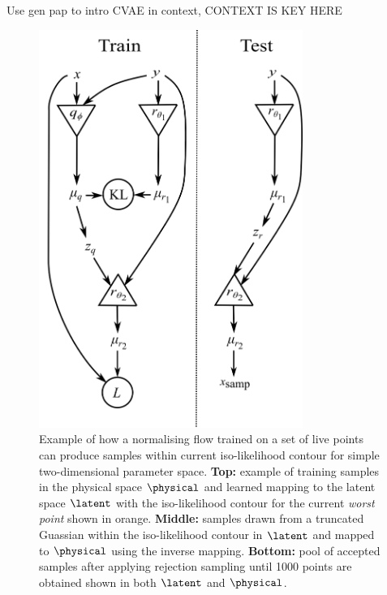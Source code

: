 \documentclass[aps,superscriptaddress,twocolumn,nopreprintnumbers,floatfix,groupedaddress]{revtex4-1}
\newcommand{\figwidth}{8.6cm}
\begin{document}
Use gen pap to intro CVAE in context, CONTEXT IS KEY HERE


\begin{figure}
	\centering
	\includegraphics[width=\figwidth]{figs/network_setup.png}
	\caption{Example of how a normalising flow trained on a set of live points can produce samples within current iso-likelihood contour for simple two-dimensional parameter space. \textbf{Top:} example of training samples in the physical space $\physical$ and learned mapping to the latent space $\latent$ with the iso-likelihood contour for the current \textit{worst point} shown in orange. \textbf{Middle:} samples drawn from a truncated Guassian within the iso-likelihood contour in $\latent$ and mapped to $\physical$ using the inverse mapping. \textbf{Bottom:} pool of accepted samples after applying rejection sampling until 1000 points are obtained shown in both $\latent$ and $\physical$.}
	\label{fig:vit_flow}
\end{figure}
\end{document}
